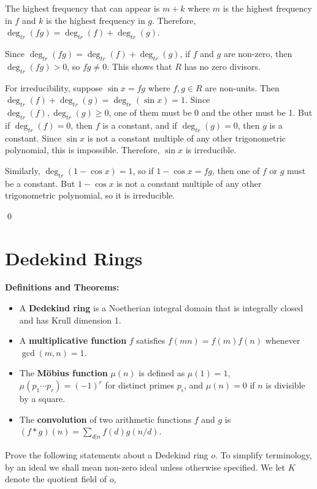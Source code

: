 The highest frequency that can appear is $m + k$ where $m$ is the highest frequency in $f$ and $k$ is the highest frequency in $g$. Therefore, $\deg_{tr}(fg) = \deg_{tr}(f) + \deg_{tr}(g)$.

Since $\deg_{tr}(fg) = \deg_{tr}(f) + \deg_{tr}(g)$, if $f$ and $g$ are non-zero, then $\deg_{tr}(fg) > 0$, so $fg \neq 0$. This shows that $R$ has no zero divisors.

For irreducibility, suppose $\sin x = fg$ where $f, g \in R$ are non-units. Then $\deg_{tr}(f) + \deg_{tr}(g) = \deg_{tr}(\sin x) = 1$. Since $\deg_{tr}(f), \deg_{tr}(g) \geq 0$, one of them must be 0 and the other must be 1. But if $\deg_{tr}(f) = 0$, then $f$ is a constant, and if $\deg_{tr}(g) = 0$, then $g$ is a constant. Since $\sin x$ is not a constant multiple of any other trigonometric polynomial, this is impossible. Therefore, $\sin x$ is irreducible.

Similarly, $\deg_{tr}(1 - \cos x) = 1$, so if $1 - \cos x = fg$, then one of $f$ or $g$ must be a constant. But $1 - \cos x$ is not a constant multiple of any other trigonometric polynomial, so it is irreducible.


\qed
\section{Dedekind Rings}

\noindent\textbf{Definitions and Theorems:}
\begin{itemize}
\item A \textbf{Dedekind ring} is a Noetherian integral domain that is integrally closed and has Krull dimension 1.
\item A \textbf{multiplicative function} $f$ satisfies $f(mn) = f(m)f(n)$ whenever $\gcd(m,n) = 1$.
\item The \textbf{M\"obius function} $\mu(n)$ is defined as $\mu(1) = 1$, $\mu(p_1 \cdots p_r) = (-1)^r$ for distinct primes $p_i$, and $\mu(n) = 0$ if $n$ is divisible by a square.
\item The \textbf{convolution} of two arithmetic functions $f$ and $g$ is $(f * g)(n) = \sum_{d|n} f(d)g(n/d)$.
\end{itemize}

Prove the following statements about a Dedekind ring $o$. To simplify terminology,
by an ideal we shall mean non-zero ideal unless otherwise specified. We let $K$
denote the quotient field of $o$,

